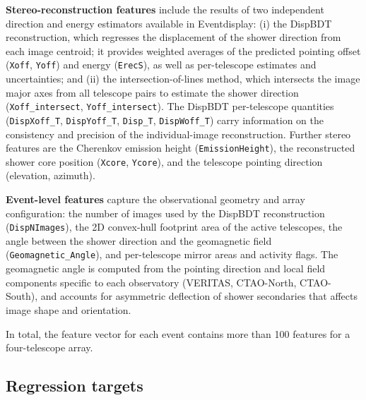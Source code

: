 \documentclass[12pt]{article}
\begin{document}
\textbf{Stereo-reconstruction features} include the results of two independent
direction and energy estimators available in Eventdisplay:
(i) the DispBDT reconstruction, which regresses the displacement of the shower
direction from each image centroid; it provides weighted averages of the
predicted pointing offset (\texttt{Xoff}, \texttt{Yoff}) and energy
(\texttt{ErecS}), as well as per-telescope estimates and uncertainties;
and (ii) the intersection-of-lines method, which intersects the image major axes
from all telescope pairs to estimate the shower direction (\texttt{Xoff\_intersect},
\texttt{Yoff\_intersect}).
The DispBDT per-telescope quantities (\texttt{DispXoff\_T}, \texttt{DispYoff\_T},
\texttt{Disp\_T}, \texttt{DispWoff\_T}) carry information on the consistency
and precision of the individual-image reconstruction.
Further stereo features are the Cherenkov emission height (\texttt{EmissionHeight}),
the reconstructed shower core position (\texttt{Xcore}, \texttt{Ycore}),
and the telescope pointing direction (elevation, azimuth).

\textbf{Event-level features} capture the observational geometry and array
configuration: the number of images used by the DispBDT reconstruction
(\texttt{DispNImages}), the 2D convex-hull footprint area of the active telescopes,
the angle between the shower direction and the geomagnetic field
(\texttt{Geomagnetic\_Angle}), and per-telescope mirror areas and activity flags.
The geomagnetic angle is computed from the pointing direction and local field
components specific to each observatory (VERITAS, CTAO-North, CTAO-South),
and accounts for asymmetric deflection of shower secondaries that affects
image shape and orientation.

In total, the feature vector for each event contains more than 100 features
for a four-telescope array.

\subsection{Regression targets}
\label{sec:targets}
\end{document}
